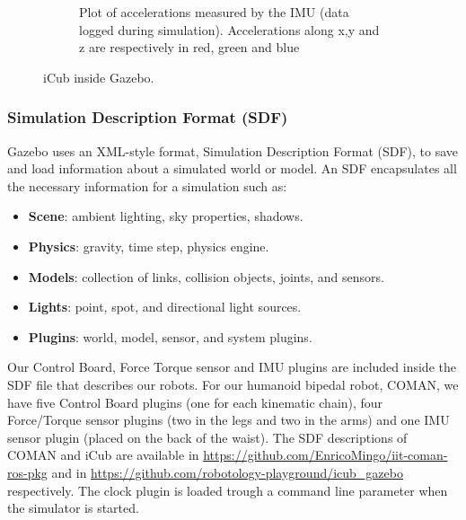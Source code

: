 \begin{figure}
\begin{subfigure}[b]{0.475\textwidth}
                \caption{Plot of accelerations measured by the IMU (data logged during simulation). Accelerations along x,y and z are respectively in red, green and blue}
                \label{yarp_simulation_icub_c}
        \end{subfigure}
        \caption{iCub inside Gazebo.}\label{icub_inertial}
\end{figure}

\subsubsection{Simulation Description Format (SDF)}
Gazebo uses an XML-style format, Simulation Description Format (SDF), to save and load information about a simulated world or model. An SDF encapsulates all the necessary information for a simulation such as:
\begin{itemize}
\item \textbf{Scene}: ambient lighting, sky properties, shadows.
\item \textbf{Physics}: gravity, time step, physics engine.
\item \textbf{Models}: collection of links, collision objects, joints, and sensors.
\item \textbf{Lights}: point, spot, and directional light sources.
\item \textbf{Plugins}: world, model, sensor, and system plugins.
\end{itemize}
Our Control Board, Force Torque sensor and IMU plugins are included inside the SDF file that describes our robots. For our humanoid bipedal robot, COMAN, we have five Control Board plugins (one for each kinematic chain), four Force/Torque sensor plugins (two in the legs and two in the arms) and one IMU sensor plugin (placed on the back of the waist). The SDF descriptions of COMAN and iCub are available in \url{https://github.com/EnricoMingo/iit-coman-ros-pkg} and in \url{https://github.com/robotology-playground/icub_gazebo} respectively.
The clock plugin is loaded trough a command line parameter when the simulator is started.




